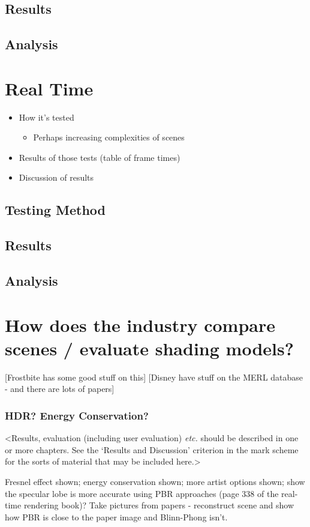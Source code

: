 \subsection{Results}

\subsection{Analysis}

\section{Real Time}

\begin{itemize}
	\item How it's tested
	\begin{itemize}
		\item Perhaps increasing complexities of scenes
	\end{itemize}
	\item Results of those tests (table of frame times)
	\item Discussion of results
\end{itemize}

\subsection{Testing Method}

\subsection{Results}

\subsection{Analysis}

\section{How does the industry compare scenes / evaluate shading models?}

[Frostbite has some good stuff on this]
[Disney have stuff on the MERL database - and there are lots of papers]

\subsubsection{HDR? Energy Conservation?}

<Results, evaluation (including user evaluation) {\em etc.} should be described in one or more chapters. See the `Results and Discussion' criterion in the mark scheme for the sorts of material that may be included here.>

Fresnel effect shown; energy conservation shown; more artist options shown; show the specular lobe is more accurate using PBR approaches (page 338 of the real-time rendering book)? Take pictures from papers - reconstruct scene and show how PBR is close to the paper image and Blinn-Phong isn't.
